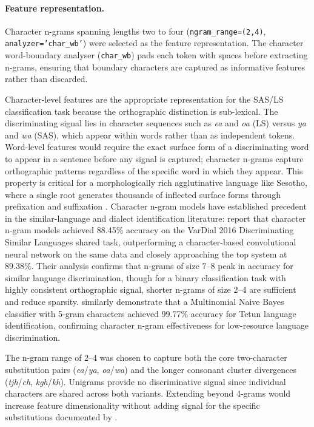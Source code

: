 \documentclass[11pt,a4paper]{article}
\begin{document}
\paragraph{Feature representation.}
Character n-grams spanning lengths two to four
(\texttt{ngram\_range=(2,4)}, \texttt{analyzer='char\_wb'}) were
selected as the feature representation. The character word-boundary
analyser (\texttt{char\_wb}) pads each token with spaces before
extracting n-grams, ensuring that boundary characters are captured
as informative features rather than discarded.

Character-level features are the appropriate representation for
the SAS/LS classification task because the orthographic distinction
is sub-lexical. The discriminating signal lies in character sequences
such as \textit{ea} and \textit{oa} (LS) versus \textit{ya} and
\textit{wa} (SAS), which appear within words rather than as
independent tokens. Word-level features would require the exact
surface form of a discriminating word to appear in a sentence before
any signal is captured; character n-grams capture orthographic
patterns regardless of the specific word in which they appear.
This property is critical for a morphologically rich agglutinative
language like Sesotho, where a single root generates thousands of
inflected surface forms through prefixation and suffixation
\citep{kambarami2021computational}. Character n-gram models have
established precedent in the similar-language and dialect
identification literature: \citet{cianflone2016n} report that
character n-gram models achieved 88.45\% accuracy on the VarDial
2016 Discriminating Similar Languages shared task, outperforming a
character-based convolutional neural network on the same data and
closely approaching the top system at 89.38\%. Their analysis
confirms that n-grams of size 7--8 peak in accuracy for similar
language discrimination, though for a binary classification task
with highly consistent orthographic signal, shorter n-grams of
size 2--4 are sufficient and reduce sparsity.
\citet{de2024data} similarly demonstrate that a Multinomial
Naive Bayes classifier with 5-gram characters achieved 99.77\%
accuracy for Tetun language identification, confirming character
n-gram effectiveness for low-resource language discrimination.

The n-gram range of 2--4 was chosen to capture both the core
two-character substitution pairs (\textit{ea}/\textit{ya},
\textit{oa}/\textit{wa}) and the longer consonant cluster
divergences (\textit{tjh}/\textit{ch}, \textit{kgh}/\textit{kh}).
Unigrams provide no discriminative signal since individual
characters are shared across both variants. Extending beyond
4-grams would increase feature dimensionality without adding
signal for the specific substitutions documented by
\citet{makutoane2022people}.
\end{document}
